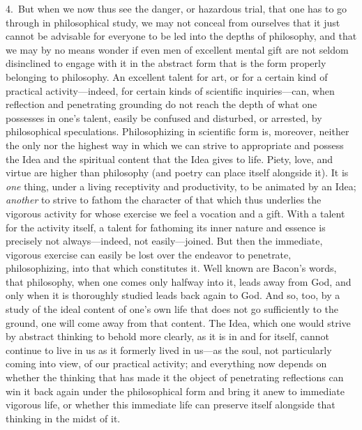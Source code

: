 \documentclass[12pt,a4paper]{book}
\begin{document}
4.~But when we now thus see the danger, or hazardous trial, that one has to go through in
philosophical study, we may not conceal from ourselves that it just cannot be advisable for everyone
to be led into the depths of philosophy, and that we may by no means wonder if even men of excellent
mental gift are not seldom disinclined to engage with it in the abstract form that is the form
properly belonging to philosophy. An excellent talent for art, or for a certain kind of practical
activity---indeed, for certain kinds of scientific inquiries---can, when reflection and penetrating
grounding do not reach the depth of what one possesses in one's talent, easily be confused and
disturbed, or arrested, by philosophical speculations. Philosophizing in scientific form is,
moreover, neither the only nor the highest way in which we can strive to appropriate and possess the
Idea and the spiritual content that the Idea gives to life. Piety, love, and virtue are higher than
philosophy (and poetry can place itself alongside it). It is \emph{one} thing, under a living receptivity and
productivity, to be animated by an Idea; \emph{another} to strive to fathom the character of that
which thus underlies the vigorous activity for whose exercise we feel a vocation and a gift. With a
talent for the activity itself, a talent for fathoming its inner nature and essence is precisely not
always---indeed, not easily---joined. But then the immediate, vigorous exercise can easily be lost
over the endeavor to penetrate, philosophizing, into that which constitutes it. Well known are
Bacon's words, that philosophy, when one comes only halfway into it, leads away from God, and only
when it is thoroughly studied leads back again to God. And so, too, by a study of the ideal content of
one's own life that does not go sufficiently to the ground, one will come away from that content. The
Idea, which one would strive by abstract thinking to behold more clearly, as it is in and for itself,
cannot continue to live in us as it formerly lived in us---as the soul, not particularly coming into
view, of our practical activity; and everything now depends on whether the thinking that has made it
the object of penetrating reflections can win it back again under the philosophical form and bring it
anew to immediate vigorous life, or whether this immediate life can preserve itself alongside that
thinking in the midst of it.
\end{document}
